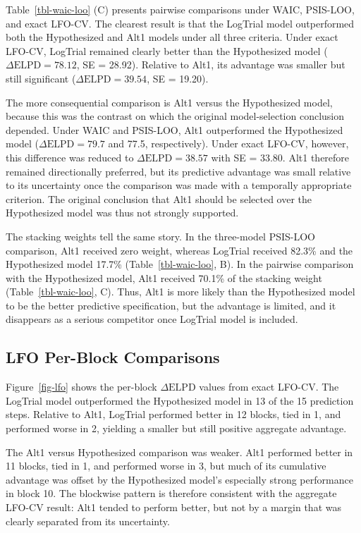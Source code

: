 \documentclass[
  man,
  floatsintext,
  longtable,
  nolmodern,
  notxfonts,
  notimes,
  colorlinks=true,linkcolor=blue,citecolor=blue,urlcolor=blue]{apa7}
\begin{document}
Table~\ref{tbl-waic-loo} (C) presents pairwise comparisons under WAIC,
PSIS-LOO, and exact LFO-CV. The clearest result is that the LogTrial
model outperformed both the Hypothesized and Alt1 models under all three
criteria. Under exact LFO-CV, LogTrial remained clearly better than the
Hypothesized model (\(\Delta \mathrm{ELPD} = 78.12\), SE = 28.92).
Relative to Alt1, its advantage was smaller but still significant
(\(\Delta \mathrm{ELPD} = 39.54\), SE = 19.20).

The more consequential comparison is Alt1 versus the Hypothesized model,
because this was the contrast on which the original model-selection
conclusion depended. Under WAIC and PSIS-LOO, Alt1 outperformed the
Hypothesized model (\(\Delta \mathrm{ELPD} = 79.7\) and 77.5,
respectively). Under exact LFO-CV, however, this difference was reduced
to \(\Delta \mathrm{ELPD} = 38.57\) with SE = 33.80. Alt1 therefore
remained directionally preferred, but its predictive advantage was small
relative to its uncertainty once the comparison was made with a
temporally appropriate criterion. The original conclusion that Alt1
should be selected over the Hypothesized model was thus not strongly
supported.

The stacking weights tell the same story. In the three-model PSIS-LOO
comparison, Alt1 received zero weight, whereas LogTrial received 82.3\%
and the Hypothesized model 17.7\% (Table~\ref{tbl-waic-loo}, B). In the
pairwise comparison with the Hypothesized model, Alt1 received 70.1\% of
the stacking weight (Table~\ref{tbl-waic-loo}, C). Thus, Alt1 is more
likely than the Hypothesized model to be the better predictive
specification, but the advantage is limited, and it disappears as a
serious competitor once LogTrial model is included.

\subsection{LFO Per-Block Comparisons}\label{lfo-per-block-comparisons}

Figure~\ref{fig-lfo} shows the per-block \(\Delta \mathrm{ELPD}\) values
from exact LFO-CV. The LogTrial model outperformed the Hypothesized
model in 13 of the 15 prediction steps. Relative to Alt1, LogTrial
performed better in 12 blocks, tied in 1, and performed worse in 2,
yielding a smaller but still positive aggregate advantage.

The Alt1 versus Hypothesized comparison was weaker. Alt1 performed
better in 11 blocks, tied in 1, and performed worse in 3, but much of
its cumulative advantage was offset by the Hypothesized model's
especially strong performance in block 10. The blockwise pattern is
therefore consistent with the aggregate LFO-CV result: Alt1 tended to
perform better, but not by a margin that was clearly separated from its
uncertainty.
\end{document}
